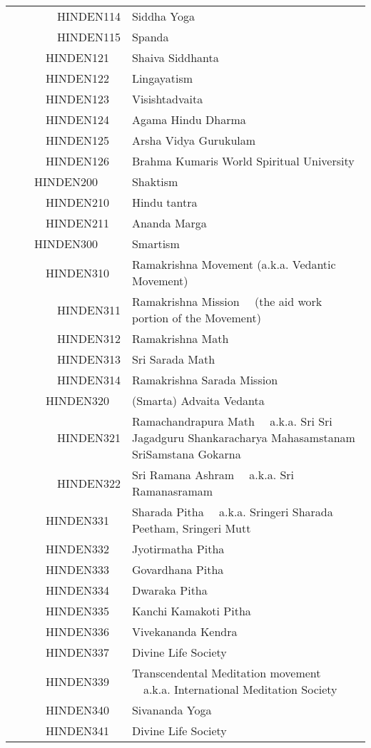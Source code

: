 \documentclass[12pt]{article}
\begin{document}
\begin{tiny}
\begin{center}
\begin{longtable}{|l|l|}
~~~~~~~~HINDEN114 & Siddha Yoga \\
~~~~~~~~HINDEN115 & Spanda \\
~~~~~~HINDEN121 & Shaiva Siddhanta \\
~~~~~~HINDEN122 & Lingayatism \\
~~~~~~HINDEN123 & Visishtadvaita \\
~~~~~~HINDEN124 & Agama Hindu Dharma \\
~~~~~~HINDEN125 & Arsha Vidya Gurukulam \\
~~~~~~HINDEN126 & Brahma Kumaris World Spiritual University \\
~~~~HINDEN200 & Shaktism \\
~~~~~~HINDEN210 & Hindu tantra \\
~~~~~~HINDEN211 & Ananda Marga \\
~~~~HINDEN300 & Smartism \\
~~~~~~HINDEN310 & Ramakrishna Movement (a.k.a. Vedantic Movement) \\
~~~~~~~~HINDEN311 & Ramakrishna Mission	~~(the aid work portion of the Movement) \\
~~~~~~~~HINDEN312 & Ramakrishna Math \\
~~~~~~~~HINDEN313 & Sri Sarada Math \\
~~~~~~~~HINDEN314 & Ramakrishna Sarada Mission \\
~~~~~~HINDEN320 & (Smarta) Advaita Vedanta \\
~~~~~~~~HINDEN321 & Ramachandrapura Math	~~a.k.a. Sri Sri Jagadguru Shankaracharya Mahasamstanam SriSamstana Gokarna \\
~~~~~~~~HINDEN322 & Sri Ramana Ashram	~~a.k.a. Sri Ramanasramam \\
~~~~~~HINDEN331 & Sharada Pitha	~~a.k.a. Sringeri Sharada Peetham, Sringeri Mutt \\
~~~~~~HINDEN332 & Jyotirmatha Pitha \\
~~~~~~HINDEN333 & Govardhana Pitha \\
~~~~~~HINDEN334 & Dwaraka Pitha \\
~~~~~~HINDEN335 & Kanchi Kamakoti Pitha \\
~~~~~~HINDEN336 & Vivekananda Kendra \\
~~~~~~HINDEN337 & Divine Life Society \\
~~~~~~HINDEN339 & Transcendental Meditation movement	~~a.k.a. International Meditation Society \\
~~~~~~HINDEN340 & Sivananda Yoga \\
~~~~~~HINDEN341 & Divine Life Society \\

\end{longtable}
\end{center}
\end{tiny}
\end{document}
